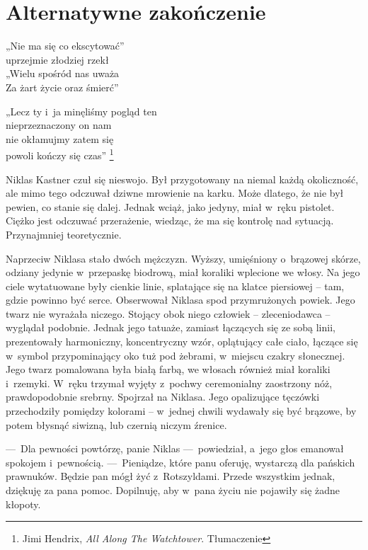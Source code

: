 \chapter{Alternatywne zakończenie}

\begin{itquote}
„Nie ma się co ekscytować”\\
uprzejmie złodziej rzekł\\
„Wielu spośród nas uważa\\
Za żart życie oraz śmierć”

\vspace{.5em}

„Lecz ty i~ja minęliśmy pogląd ten\\
nieprzeznaczony on nam\\
nie okłamujmy zatem się\\
powoli kończy się czas”
\footnote{Jimi Hendrix, \emph{All Along The Watchtower}. Tłumaczenie }
\end{itquote}

Niklas Kastner czuł się nieswojo. Był przygotowany na niemal każdą okoliczność, ale mimo tego odczuwał dziwne mrowienie na karku. Może dlatego, że nie był pewien, co stanie się dalej. Jednak wciąż, jako jedyny, miał w~ręku pistolet. Ciężko jest odczuwać przerażenie, wiedząc, że ma się kontrolę nad sytuacją. Przynajmniej teoretycznie.

Naprzeciw Niklasa stało dwóch mężczyzn. Wyższy, umięśniony o~brązowej skórze, odziany jedynie w~przepaskę biodrową, miał koraliki wplecione we włosy. Na jego ciele wytatuowane były cienkie linie, splatające się na klatce piersiowej -- tam, gdzie powinno być serce. Obserwował Niklasa spod przymrużonych powiek. Jego twarz nie wyrażała niczego. Stojący obok niego człowiek -- zleceniodawca -- wyglądał podobnie. Jednak jego tatuaże, zamiast łączących się ze sobą linii, prezentowały harmoniczny, koncentryczny wzór, oplątujący całe ciało, łączące się w~symbol przypominający oko tuż pod żebrami, w~miejscu czakry słonecznej. Jego twarz pomalowana była białą farbą, we włosach również miał koraliki i~rzemyki. W~ręku trzymał wyjęty z~pochwy ceremonialny zaostrzony nóż, prawdopodobnie srebrny. Spojrzał na Niklasa. Jego opalizujące tęczówki przechodziły pomiędzy kolorami -- w~jednej chwili wydawały się być brązowe, by potem błysnąć siwizną, lub czernią niczym źrenice.

---~Dla pewności powtórzę, panie Niklas ---~powiedział, a~jego głos emanował spokojem i~pewnością. ---~Pieniądze, które panu oferuję, wystarczą dla pańskich prawnuków. Będzie pan mógł żyć z~Rotszyldami. Przede wszystkim jednak, dziękuję za pana pomoc. Dopilnuję, aby w~pana życiu nie pojawiły się żadne kłopoty. 

